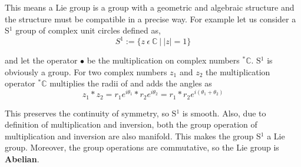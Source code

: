 This means a Lie group is a group with a geometric and algebraic structure and the structure must be compatible in a precise way. 
For example let us consider a S$^1$ group of complex unit circles defined as,
\begin{equation}
    S^1 := \{z \: \epsilon \: \mathbb{C} \: | \: |z| = 1\}
\end{equation}

and let the operator $\bullet$ be the multiplication on complex numbers $^*\mathbb{C}$. 
S$^1$ is obviously a group. For two complex numbers $z_1$ and $z_2$ the multiplication operator $^*\mathbb{C}$ multiplies the radii of and adds the angles as
\begin{equation}
    z_1*z_2 = r_1e^{i\theta_1} * r_2e^{i\theta_2} = r_1*r_2e^{i(\theta_1+\theta_2)}
\end{equation}

This preserves the continuity of symmetry, so S$^1$ is smooth. 
Also, due to definition of multiplication and inversion, both the group operation of multiplication and inversion are also manifold.
This makes the group S$^1$ a Lie group. Moreover, the group operations are commutative, so the Lie group is \textbf{Abelian}.

\newpage
